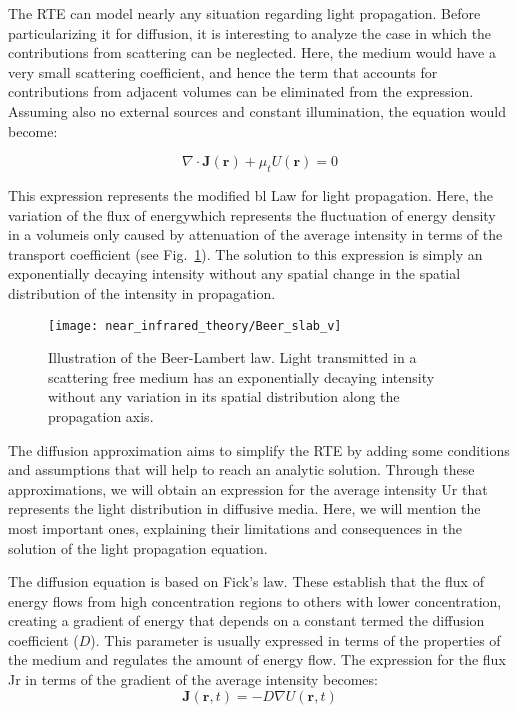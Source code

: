 The RTE can model nearly any situation regarding light propagation. Before particularizing it for diffusion, it is interesting to analyze the case in which the contributions from scattering can be neglected. Here, the medium would have a very small scattering coefficient, and hence the term that accounts for contributions from adjacent volumes can be eliminated from the expression. Assuming also no external sources and constant illumination, the equation would become:

\begin{equation}
\nabla\cdot\mathbf{J}\left(\mathbf{r}\right)+\mu_t U\left(\mathbf{r}\right)=0
\label{eq:theory_beer_law}
\end{equation}

This expression represents the modified \gls{bl} Law for light propagation. Here, the variation of the flux of energy\textemdash which represents the fluctuation of energy density in a volume\textemdash is only caused by attenuation of the average intensity in terms of the transport coefficient (see Fig.~\ref{fig:theory_beer}). The solution to this expression is simply an exponentially decaying intensity without any spatial change in the spatial distribution of the intensity in propagation.

\begin{figure}[]
\sidecaption[t]
\texttt{[image: near\_infrared\_theory/Beer\_slab\_v]}
\caption[Illustration of the Beer-Lambert Law]{Illustration of the Beer-Lambert law. Light transmitted in a scattering free medium has an exponentially decaying intensity without any variation in its spatial distribution along the propagation axis.}
\label{fig:theory_beer} 
\end{figure}

The diffusion approximation aims to simplify the RTE by adding some conditions and assumptions that will help to reach an analytic solution. Through these approximations, we will obtain an expression for the average intensity \gls{Ur} that represents the light distribution in diffusive media. Here, we will mention the most important ones, explaining their limitations and consequences in the solution of the light propagation equation.

The diffusion equation is based on Fick's law. These establish that the flux of energy flows from high concentration regions to others with lower concentration, creating a gradient of energy that depends on a constant termed the diffusion coefficient ($D$). This parameter is usually expressed in terms of the properties of the medium and regulates the amount of energy flow. The expression for the flux \gls{Jr} in terms of the gradient of the average intensity becomes:
\begin{equation}
\mathbf{J}\left(\mathbf{r},t\right)=-D\nabla U\left(\mathbf{r},t\right)
\label{eq:theory_fick}
\end{equation}

